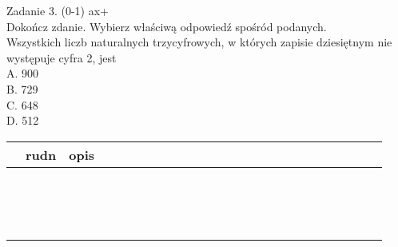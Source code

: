 \documentclass[10pt]{article}
\begin{document}
Zadanie 3. (0-1) ax+\\
Dokończ zdanie. Wybierz właściwą odpowiedź spośród podanych.\\
Wszystkich liczb naturalnych trzycyfrowych, w których zapisie dziesiętnym nie występuje cyfra 2, jest\\
A. 900\\
B. 729\\
C. 648\\
D. 512

\begin{center}
\begin{tabular}{|c|c|c|c|c|c|c|c|c|c|c|c|c|c|c|c|c|c|c|c|c|c|c|c|c|}
\hline
 & rudn & opis &  &  &  &  &  &  &  &  &  &  &  &  &  &  &  &  &  &  &  &  &  &  \\
\hline
 &  &  &  &  &  &  &  &  &  &  &  &  &  &  &  &  &  &  &  &  &  &  &  &  \\
\hline
 &  &  &  &  &  &  &  &  &  &  &  &  &  &  &  &  &  &  &  &  &  &  &  &  \\
\hline
 &  &  &  &  &  &  &  &  &  &  &  &  &  &  &  &  &  &  &  &  &  &  &  &  \\
\hline
 &  &  &  &  &  &  &  &  &  &  &  &  &  &  &  &  &  &  &  &  &  &  &  &  \\
\hline
 &  &  &  &  &  &  &  &  &  &  &  &  &  &  &  &  &  &  &  &  &  &  &  &  \\
\hline
 &  &  &  &  &  &  &  &  &  &  &  &  &  &  &  &  &  &  &  &  &  &  &  &  \\
\hline
 &  &  &  &  &  &  &  &  &  &  &  &  &  &  &  &  &  &  &  &  &  &  &  &  \\
\hline
 &  &  &  &  &  &  &  &  &  &  &  &  &  &  &  &  &  &  &  &  &  &  &  &  \\
\hline
 &  &  &  &  &  &  &  &  &  &  &  &  &  &  &  &  &  &  &  &  &  &  &  &  \\
\hline
 &  &  &  &  &  &  &  &  &  &  &  &  &  &  &  &  &  &  &  &  &  &  &  &  \\
\hline
 &  &  &  &  &  &  &  &  &  &  &  &  &  &  &  &  &  &  &  &  &  &  &  &  \\
\hline
 &  &  &  &  &  &  &  &  &  &  &  &  &  &  &  &  &  &  &  &  &  &  &  &  \\
\hline
 &  &  &  &  &  &  &  &  &  &  &  &  &  &  &  &  &  &  &  &  &  &  &  &  \\
\hline
 &  &  &  &  &  &  &  &  &  &  &  &  &  &  &  &  &  &  &  &  &  &  &  &  \\
\hline
 &  &  &  &  &  &  &  &  &  &  &  &  &  &  &  &  &  &  &  &  &  &  &  &  \\
\hline
\end{tabular}
\end{center}
\end{document}
